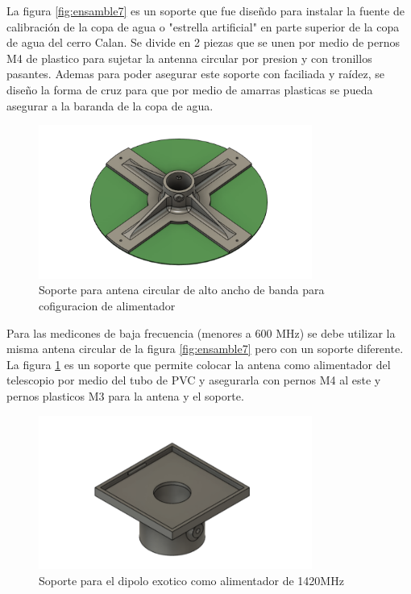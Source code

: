 La figura \ref{fig:ensamble7} es un soporte que fue diseñdo para instalar la fuente de calibración de la copa de agua o "estrella artificial" en parte superior de la copa de agua del cerro Calan. Se divide en 2 piezas que se unen por medio de pernos M4 de plastico para sujetar la antenna circular por presion y con tronillos pasantes. Ademas para poder asegurar este soporte con faciliada y raídez, se diseño la forma de cruz para que por medio de amarras plasticas se pueda asegurar a la baranda de la copa de agua.\\

\begin{figure}
    \centering
    \includegraphics[width=0.8\textwidth]{img/soporte3D2}
    \caption{Soporte para antena circular de alto ancho de banda para cofiguracion de alimentador}
    \label{fig:ensamble8}
\end{figure}

Para las medicones de baja frecuencia (menores a 600 MHz) se debe utilizar la misma antena circular de la figura \ref{fig:ensamble7} pero con un soporte diferente. La figura \ref{fig:ensamble8} es un soporte que permite colocar la antena como alimentador del telescopio por medio del tubo de PVC y asegurarla con pernos M4 al este y pernos plasticos M3 para la antena y el soporte.\\

\begin{figure}
    \centering
    \includegraphics[width=0.8\textwidth]{img/soporte3D6}
    \caption{Soporte para el dipolo exotico como alimentador de 1420MHz}
    \label{fig:ensamble9}
\end{figure}

